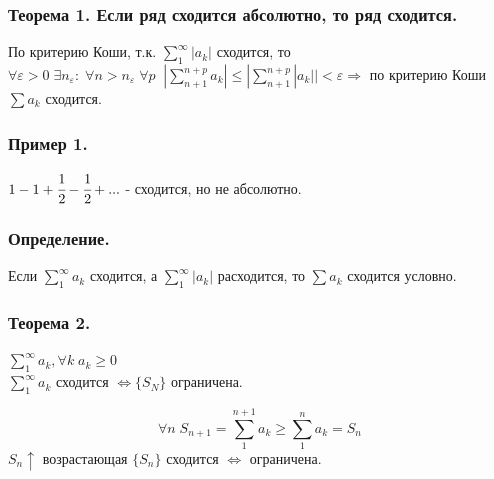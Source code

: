 \documentclass[12pt, a4paper]{article}
\newcommand{\eps}{\varepsilon}
\begin{document}
\begin{centering}
\subsubsection{\textbf{Теорема 1. Если ряд сходится абсолютно, то ряд сходится.}}
\begin{tcolorbox}[title=Доказательство (Критерий Коши)]
    По критерию Коши, т.к. $\sum^\infty_{1} |a_k|$ сходится, то $\forall \eps > 0\; \exists n_\eps:\; \forall n > n_\eps\; \forall p\;\; |\sum^{n+p}_{n+1} a_k| \leq |\sum^{n+p}_{n+1} |a_k|| < \eps \Rightarrow$ по критерию Коши $\sum a_k$ сходится.
\end{tcolorbox}
\subsubsection*{\textbf{Пример 1.}}
$1 - 1 + \cfrac{1}{2} - \cfrac{1}{2} + ... $ - сходится, но не абсолютно.
\subsubsection{\textbf{Определение.}} 
Если $\sum^{\infty}_{1} a_k$ сходится, а $\sum^{\infty}_{1} |a_k|$ расходится, то $\sum a_k$ сходится условно.
\subsubsection{\textbf{Теорема 2.}}
$\sum^{\infty}_{1} a_k, \forall k\; a_k \geq 0$\\
$\sum^{\infty}_{1} a_k$ сходится $\Leftrightarrow \{S_N\}$ ограничена.
\begin{tcolorbox}[title=Доказательство]
    \[\forall n\; S_{n+1} = \sum^{n+1}_{1} a_k \geq \sum^{n}_{1} a_k = S_n \]
    $S_n \uparrow$ возрастающая $\{S_n\}$ сходится $\Leftrightarrow$ ограничена.
\end{tcolorbox}

\end{centering}
\end{document}
